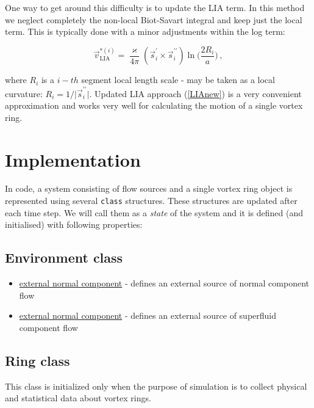 One way to get around this difficulty is to update the LIA term. In this method we neglect completely the non-local Biot-Savart integral and keep just the local term. This is typically done with a minor adjustments within the log term:

\begin{equation}
\vec{v}_{\text{LIA}}^{*(i)} =
\frac{\varkappa}{4\pi} (\vec{s}^{\prime}_i \times \vec{s}^{\prime \prime}_i)
\ln{\Bigg(\frac{2 R_i}{a}\Bigg)}\,,
\label{LIAnew}
\end{equation}

where $R_i$ is a $i-th$ segment local length scale - may be taken \cite{barenghi} as a local curvature: $R_i = 1 / \vert \vec{s}^{\prime \prime}_i \vert$. Updated LIA approach (\ref{LIAnew}) is a very convenient approximation and works very well for calculating the motion of a single vortex ring.

\section{Implementation}

In code, a system consisting of flow sources and a single vortex ring object is represented using several \texttt{class} structures. These structures are updated after each time step. We will call them as a \textit{state} of the system and it is defined (and initialised) with following properties:

\newpage

\subsection*{Environment class}

\begin{itemize}
	\item \underline{external normal component} - defines an external source of normal component flow
	\item \underline{external normal component} - defines an external source of superfluid component flow
\end{itemize}

\subsection*{Ring class}

This class is initialized only when the purpose of simulation is to collect physical and statistical data about vortex rings.

